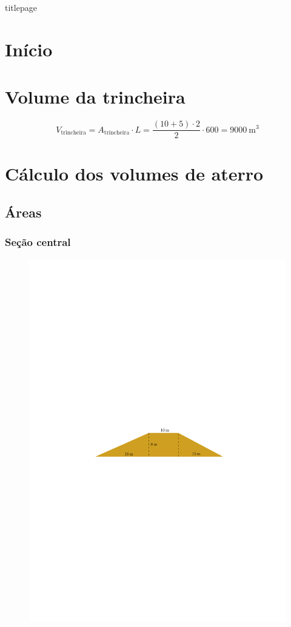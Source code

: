 \documentclass[a4paper, 12pt, brazilian]{article}
\begin{document}
	{titlepage}
	
	\tableofcontents
	
	\newpage
	
	\section{Início}
	
	\section{Volume da trincheira}
	
	\begin{equation}
		V_{\textrm{trincheira}}=A_{\textrm{trincheira}}\cdot L=\dfrac{(10+5)\cdot 2}{2}\cdot 600=\SI{9000}{\meter^{3}}
	\end{equation}
	
	\section{Cálculo dos volumes de aterro}
	
	\subsection{Áreas}
	
	\subsubsection{Seção central}
	
	\begin{figure}[H]
		\centering
		\includegraphics[width=0.85\linewidth]{images/center}
		\label{fig:center}
	\end{figure}
	
\end{document}
